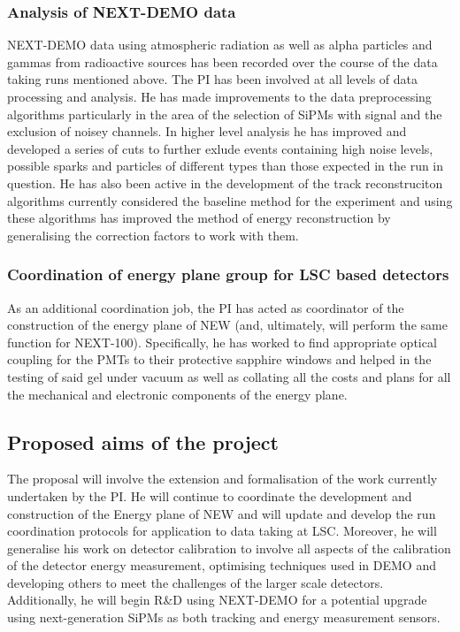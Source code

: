 \documentclass[a4paper,11pt,oneside]{article}
\begin{document}
\subsubsection*{Analysis of NEXT-DEMO data}
NEXT-DEMO data using atmospheric radiation as well as alpha particles and gammas from radioactive sources has been recorded over the course of the data taking runs mentioned above. The PI has been involved at all levels of data processing and analysis. He has made improvements to the data preprocessing algorithms particularly in the area of the selection of SiPMs with signal and the exclusion of noisey channels. In higher level analysis he has improved and developed a series of cuts to further exlude events containing high noise levels, possible sparks and particles of different types than those expected in the run in question. He has also been active in the development of the track reconstruciton algorithms currently considered the baseline method for the experiment and using these algorithms has improved the method of energy reconstruction by generalising the correction factors to work with them.

\subsubsection*{Coordination of energy plane group for LSC based detectors}
As an additional coordination job, the PI has acted as coordinator of
the construction of the energy plane of NEW (and, ultimately, will
perform the same function for NEXT-100). Specifically, he has worked
to find appropriate optical coupling for the PMTs to their protective
sapphire windows and helped in the testing of said gel under vacuum as
well as collating all the costs and plans for all the mechanical and
electronic components of the energy plane.

\subsection*{Proposed aims of the project}
\label{subSec:Prop}
The proposal will involve the extension and formalisation of the work
currently undertaken by the PI. He will continue to coordinate the
development and construction of the Energy plane of NEW and will
update and develop the run coordination protocols for application to
data taking at LSC. Moreover, he will
generalise his work on detector calibration to involve all aspects of
the calibration of the detector energy measurement, optimising
techniques used in DEMO and developing others to meet the challenges
of the larger scale detectors. Additionally, he will begin R\&D using
NEXT-DEMO for a potential upgrade using next-generation SiPMs as both tracking and
energy measurement sensors.
\end{document}
